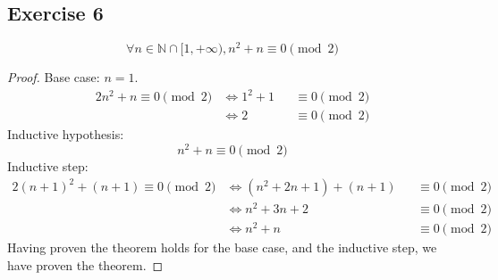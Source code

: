 \documentclass[docid=TP01]{tcom_TP}
\begin{document}
\subsection{Exercise 6}
\begin{theorem}
	\begin{equation*}
		\forall n \in \mathbb{N}\cap[1,+\infty),n^2+n \equiv 0 \pmod{2}
	\end{equation*}
\end{theorem}
\begin{proof}
	Base case: $n=1$.
	\begin{alignat*}{2}
		n^2+n \equiv 0 \pmod{2}
		&\iff 1^2+1 &&\equiv 0 \pmod{2} \\
		&\iff 2     &&\equiv 0 \pmod{2}
	\end{alignat*}
	Inductive hypothesis:
	\begin{equation*}
		n^2+n \equiv 0 \pmod{2}
	\end{equation*}
	Inductive step:
	\begin{alignat*}{2}
			(n+1)^2+(n+1) \equiv 0 \pmod{2}
			&\iff (n^2+2n+1)+(n+1) &&\equiv 0 \pmod{2} \\
			&\iff n^2+3n+2         &&\equiv 0 \pmod{2} \\
			&\iff n^2+n            &&\equiv 0 \pmod{2}
	\end{alignat*}
	Having proven the theorem holds for the base case, and the inductive step, we have proven the theorem.
\end{proof}
\end{document}
